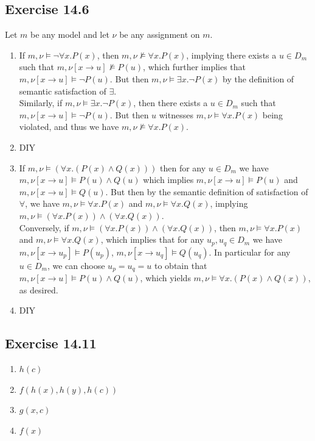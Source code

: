 \documentclass{article}
\begin{document}
\subsection*{Exercise 14.6}
Let $m$ be any model and let $\nu$ be any assignment on $m$. 
\begin{enumerate}[label=(\alph*)]
\item If $m, \nu\models \lnot\forall x. P(x)$, then $m, \nu\not\models\forall x. P(x)$, implying there exists a $u\in D_m$ such that $m, \nu[x\rightarrow u]\not\models P(u)$, which further implies that $m, \nu[x\rightarrow u]\models \lnot P(u)$. But then $m, \nu\models\exists x.\lnot P(x)$ by the definition of semantic satisfaction of $\exists$.\\
Similarly, if $m, \nu\models\exists x.\lnot P(x)$, then there exists a $u\in D_m$ such that $m, \nu[x\rightarrow u]\models \lnot P(u)$. But then $u$ witnesses $m, \nu\models\forall x.P(x)$ being violated, and thus we have $m, \nu\not\models\forall x.P(x)$.
\item DIY
\item If $m, \nu\models (\forall x. (P(x) \wedge Q(x)))$ then for any $u\in D_m$ we have $m, \nu[x\rightarrow u]\models P(u)\wedge Q(u)$ which implies $m, \nu[x\rightarrow u]\models P(u)$ and $m, \nu[x\rightarrow u]\models Q(u)$. But then by the semantic definition of satisfaction of $\forall$, we have $m, \nu\models\forall x. P(x)$ and $m, \nu\models\forall x. Q(x)$, implying $m, \nu\models(\forall x. P(x))\wedge(\forall x. Q(x))$.\\
Conversely, if $m, \nu\models(\forall x. P(x))\wedge(\forall x. Q(x))$, then $m, \nu\models\forall x. P(x)$ and $m, \nu\models\forall x. Q(x)$, which implies that for any $u_p, u_q\in D_m$ we have $m, \nu[x\rightarrow u_p]\models P(u_p)$, $m, \nu[x\rightarrow u_q]\models Q(u_q)$. In particular for any $u\in D_m$, we can choose $u_p = u_q = u$ to obtain that $m, \nu[x\rightarrow u]\models P(u)\wedge Q(u)$, which yields $m, \nu\models\forall x.(P(x)\wedge Q(x))$, as desired.
\item DIY
\end{enumerate}
\subsection*{Exercise 14.11}
\begin{enumerate}[label=(\alph*)]
    \item $h(c)$
    \item $f(h(x), h(y), h(c))$
    \item $g(x, c)$
    \item $f(x)$
\end{enumerate}
\end{document}
